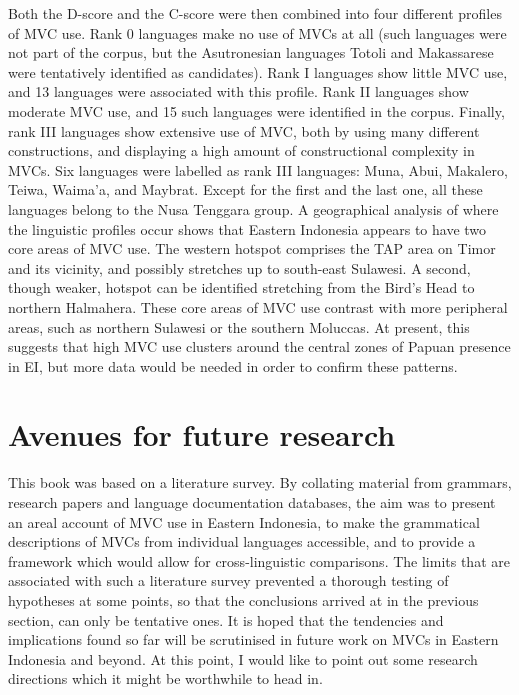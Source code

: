 Both the D-score and the C-score were then combined into four different profiles of MVC use. Rank 0 languages make no use of MVCs at all (such languages were not part of the corpus, but the Asutronesian languages Totoli and Makassarese were tentatively identified as candidates). Rank I languages show little MVC use, and 13 languages were associated with this profile. Rank II languages show moderate MVC use, and 15 such languages were identified in the corpus. Finally, rank III languages show extensive use of MVC, both by using many different constructions, and displaying a high amount of constructional complexity in MVCs. Six languages were labelled as rank III languages: Muna, Abui, Makalero, Teiwa, Waima'a, and Maybrat. Except for the first and the last one, all these languages belong to the Nusa Tenggara group. A geographical analysis of where the linguistic profiles occur shows that Eastern Indonesia appears to have two core areas of MVC use. The western hotspot comprises the TAP area on Timor and its vicinity, and possibly stretches up to south-east Sulawesi. A second, though weaker, hotspot can be identified stretching from the Bird's Head to northern Halmahera. These core areas of MVC use contrast with more peripheral areas, such as northern Sulawesi or the southern Moluccas. At present, this suggests that high MVC use clusters around the central zones of Papuan presence in EI, but more data would be needed in order to confirm these patterns.

\section{Avenues for future research}

This book was based on a literature survey. By collating material from grammars, research papers and language documentation databases, the aim was to present an areal account of MVC use in Eastern Indonesia, to make the grammatical descriptions of MVCs from individual languages accessible, and to provide a framework which would allow for cross-linguistic comparisons. The limits that are associated with such a literature survey prevented a thorough testing of hypotheses at some points, so that the conclusions arrived at in the previous section, can only be tentative ones. It is hoped that the tendencies and implications found so far will be scrutinised in future work on MVCs in Eastern Indonesia and beyond. At this point, I would like to point out some research directions which it might be worthwhile to head in.

